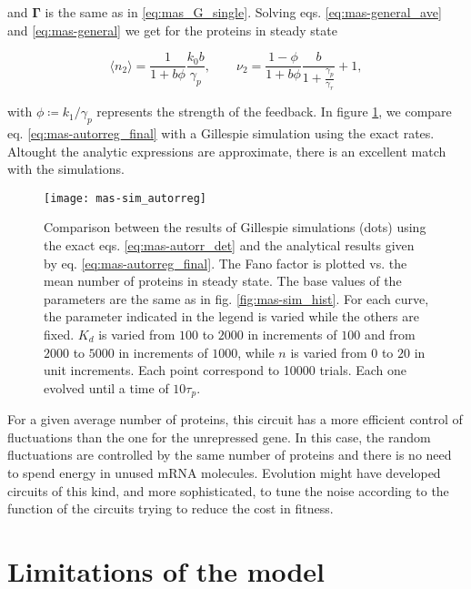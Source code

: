 and $\mathbf{\Gamma}$ is the same as in \eqref{eq:mas_G_single}. Solving eqs. \eqref{eq:mas-general_ave} and \eqref{eq:mas-general} we get for the proteins in steady state

\begin{equation}
  \label{eq:mas-autorreg_final}
  \langle n_2\rangle = \frac{1}{1+b\phi}\frac{k_0b}{\gamma_p},\quad\quad \nu_2 = \frac{1-\phi}{1+b\phi}\frac{b}{1+\frac{\gamma_p}{\gamma_r}}+1,
\end{equation}

with $\phi\coloneqq k_1/\gamma_p$ represents the strength of the feedback. In figure \ref{fig:mas-sim_autorreg}, we compare eq. \eqref{eq:mas-autorreg_final}  with a Gillespie simulation using the exact rates. Altought the analytic expressions are approximate, there is an excellent match with the simulations.

\begin{figure}[H]
  \centering
  \texttt{[image: mas-sim\_autorreg]}
  \caption[Fano factor of protein number for a negatively autorregulated gene]{\label{fig:mas-sim_autorreg} Comparison between the results of Gillespie simulations (dots) using the exact eqs. \eqref{eq:mas-autorr_det} and the analytical results given by eq. \eqref{eq:mas-autorreg_final}. The Fano factor is plotted vs. the mean number of proteins in steady state. The base values of the parameters are the same as in fig. \ref{fig:mas-sim_hist}. For each curve, the parameter indicated in the legend is varied while the others are fixed. $K_d$ is varied from $100$ to $2000$ in increments of $100$ and from $2000$ to $5000$ in increments of $1000$, while $n$ is varied from $0$ to $20$ in unit increments. Each point correspond to 10000 trials. Each one evolved until a time of $10\tau_p$.}
\end{figure}

For a given average number of proteins, this circuit has a more efficient control of fluctuations than the one for the unrepressed gene. In this case, the random fluctuations are controlled by the same number of proteins and there is no need to spend energy in unused mRNA molecules. Evolution might have developed circuits of this kind, and more sophisticated, to tune the noise according to the function of the circuits trying to reduce the cost in fitness.

\section{Limitations of the model}

